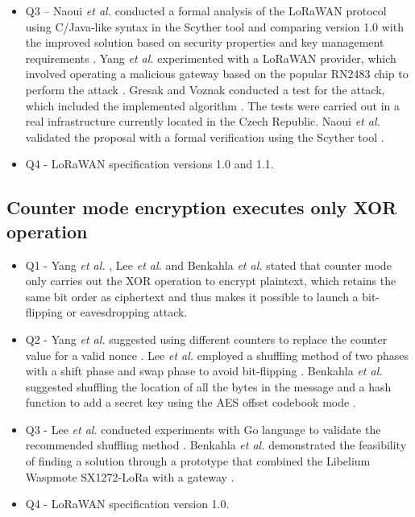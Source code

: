 \documentclass[manuscript,screen,review=false]{acmart}
\begin{document}
\begin{itemize}
\item Q3 – Naoui {\it et al.} conducted a formal analysis of the LoRaWAN protocol using C/Java-like syntax in the Scyther tool and comparing version 1.0 with the improved solution based on security properties and key management requirements \cite{35_third_party_key_management}. Yang {\it et al.} experimented with a LoRaWAN provider, which involved operating a malicious gateway based on the popular RN2483 chip to perform the attack \cite{37_security_vulnerabilities_lorawan}. Gresak and Voznak conducted a test for the attack, which included the implemented algorithm \cite{97_protecting_gateway}. The tests were carried out in a real infrastructure currently located in the Czech Republic. Naoui {\it et al.} validated the proposal with a formal verification using the Scyther tool \cite{98_lorawan_framework_smarthome}.

\item Q4 - LoRaWAN specification versions 1.0 and 1.1.

\end{itemize}

\subsection{Counter mode encryption executes only XOR operation}

\begin{itemize}
\item Q1 - Yang {\it et al.} \cite{37_security_vulnerabilities_lorawan}, Lee {\it et al.} \cite{40_countermeasure_bitflipping} and Benkahla {\it et al.} \cite{49_analysis_lorawan_duty_cycle} stated that counter mode only carries out the XOR operation to encrypt plaintext, which retains the same bit order as ciphertext and thus makes it possible to launch a bit-flipping or eavesdropping attack.

\item Q2 - Yang {\it et al.} suggested using different counters to replace the counter value for a valid nonce \cite{37_security_vulnerabilities_lorawan}. Lee {\it et al.} employed a shuffling method of two phases with a shift phase and swap phase to avoid bit-flipping \cite{40_countermeasure_bitflipping}. Benkahla {\it et al.}  suggested shuffling the location of all the bytes in the message and a hash function to add a secret key using the AES offset codebook mode \cite{49_analysis_lorawan_duty_cycle}.

\item Q3 - Lee {\it et al.} conducted experiments with Go language to validate the recommended shuffling method \cite{40_countermeasure_bitflipping}. Benkahla {\it et al.}  demonstrated the feasibility of finding a solution through a prototype that combined the Libelium Waspmote SX1272-LoRa with a gateway \cite{49_analysis_lorawan_duty_cycle}.

\item Q4 - LoRaWAN specification version 1.0.
\end{itemize}
\end{document}
